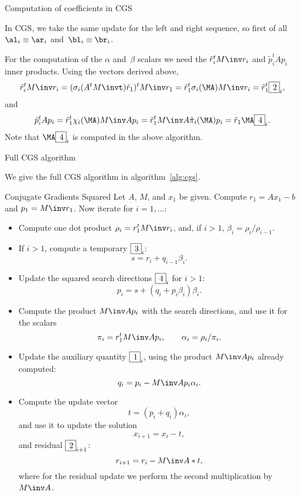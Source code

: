  {Computation of coefficients in CGS}

In CGS, we take the same update for the left and right sequence,
so first of all $\al_i\equiv\ar_i$ and~$\bl_i\equiv\nobreak\br_i$.

For the computation of the $\alpha$ and~$\beta$ scalars
we need the $\tilde r_i^tM\inv r_i$ and $\tilde p_i^tAp_i$
inner products. Using the vectors derived above,
\[ \tilde r_i^tM\inv r_i=(\sigma_i(A^tM\invt)\tilde r_1)^tM\inv r_1 =
   \tilde r_1^t\sigma_i(\MA)M\inv r_i =\tilde r_1^t\B2i, \]
and
\[ \tilde p_i^tAp_i=\tilde r_1^t\chi_i(\MA)M\inv Ap_i
     =\tilde r_1^tM\inv A\tilde \pi_i(\MA)p_i=\tilde r_1\MA\B4i. \]
Note that $\MA\B4i$ is computed in the above algorithm.

 {Full CGS algorithm}

We give the full CGS algorithm in algorithm~\ref{alg:cgs}.
\begin{algorithm}{Conjugate Gradients Squared}
\label{alg:cgs}
Let $A$, $M$, and $x_1$ be given. 
Compute $r_1=Ax_1-b$ 
and $p_1=M\inv r_1$.
Now iterate for $i=1,\ldots$:
\begin{itemize}
\item
Compute one dot product $\rho_i = r_1^tM\inv r_i$,
and, if $i>1$, $\beta_i=\rho_i/\rho_{i-1}$.
\item If $i>1$, compute a temporary $\fbox{$\,3$}_{i}$:
\[ s = r_i+ q_{i-1}\beta_i. \]
\item Update the squared search directions $\fbox{$\,4$}_{i}$ for $i>1$:
\[ p_i = s+(q_i+p_i\beta_i)\beta_i. \]
\item Compute the product $M\inv Ap_i$ with the search directions,
and use it for the scalars
\[ \pi_i = r_1^tM\inv Ap_i, \qquad
\alpha_i=\rho_i/\pi_i. \]
\item Update the auxiliary quantity $\fbox{$\,1$}_{i}$, using the
product $M\inv Ap_i$ already computed:
\[ q_i=p_i-M\inv Ap_i\alpha_i. \]
\item 
Compute the update vector 
\[ t=(p_i+q_i)\alpha_i, \]
and use it to update the solution \[ x_{i+1}=x_i-t, \]
and residual $\fbox{$\,2$}_{i+1}$:
\[ r_{i+1}=r_i-M\inv A*t,\]
where for the residual update we perform the second multiplication
by~$M\inv A$.
\end{itemize}
\end{algorithm}

